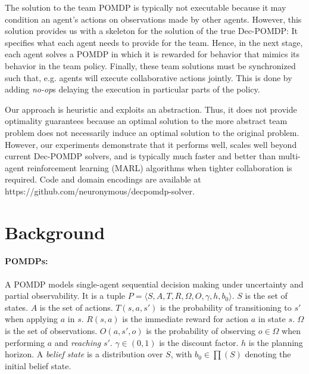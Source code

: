 \documentclass[runningheads]{llncs}
\newcommand{\citep}{\cite}
\begin{document}
{The solution to the team POMDP is typically not
executable because it may condition an agent's actions on observations made 
by other agents. However, this solution provides us with a 
skeleton for the solution of the true Dec-POMDP: It specifies what each agent needs to provide for the team.  
Hence, in the next stage, each agent solves a POMDP in which it is rewarded for behavior that mimics its behavior in the team policy. Finally, these team solutions must be synchronized such that, e.g. agents will execute collaborative actions jointly. This is done by adding {\em no-op}s delaying the execution in particular parts of the policy.

Our approach is heuristic and exploits an abstraction. Thus, it does not provide optimality guarantees because
an optimal solution to the more abstract team problem does not necessarily induce an optimal solution to the original problem. %
However, our experiments demonstrate that it performs well, scales well beyond current Dec-POMDP solvers, and is typically much faster and better than
multi-agent reinforcement learning (MARL) algorithms when tighter collaboration is required. Code and domain encodings are available at https://github.com/neuronymous/decpomdp-solver.
}



\section{Background}



\paragraph{POMDPs:}
A POMDP models single-agent sequential decision making under uncertainty and partial observability.
It is a tuple $P=\langle S, A, T, R, \Omega, O, \gamma, h, b_0 \rangle$.
$S$ is the set of states. $A$ is the set of actions.
$T(s, a, s')$ is the probability of transitioning to $s'$ when applying $a$ in $s$. 
$R(s,a)$ is the immediate reward for action $a$ in state $s$.
$\Omega$ is the set of observations. 
$O(a,s',o)$ is the probability of observing $o\in \Omega$ when performing $a$ and \emph{reaching} $s'$. 
$\gamma \in (0,1)$ is the discount factor.  
$h$ is the planning horizon. A {\em belief state} is a  distribution over $S$, 
with $b_0\in \prod(S)$ denoting  the initial belief state. 
\end{document}
